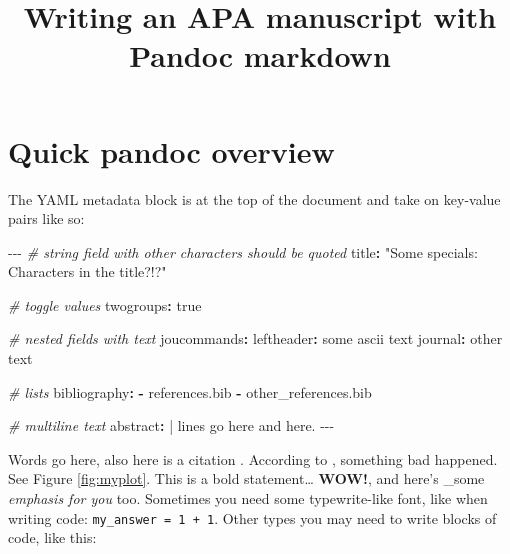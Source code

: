 \documentclass[man,longtable,noextraspace,floatsintext]{apa6}
\title{Writing an APA manuscript with Pandoc markdown}
\newenvironment{Shaded}{}{}
\newcommand{\AttributeTok}[1]{\textcolor[rgb]{0.49,0.56,0.16}{#1}}
\newcommand{\CharTok}[1]{\textcolor[rgb]{0.25,0.44,0.63}{#1}}
\newcommand{\CommentTok}[1]{\textcolor[rgb]{0.38,0.63,0.69}{\textit{#1}}}
\newcommand{\FunctionTok}[1]{\textcolor[rgb]{0.02,0.16,0.49}{#1}}
\newcommand{\KeywordTok}[1]{\textcolor[rgb]{0.00,0.44,0.13}{\textbf{#1}}}
\newcommand{\NormalTok}[1]{#1}
\newcommand{\PreprocessorTok}[1]{\textcolor[rgb]{0.74,0.48,0.00}{#1}}
\newcommand{\StringTok}[1]{\textcolor[rgb]{0.25,0.44,0.63}{#1}}
\begin{document}
\maketitle

\hypertarget{quick-pandoc-overview}{%
\section{Quick pandoc overview}\label{quick-pandoc-overview}}

The YAML metadata block is at the top of the document and take on
key-value pairs like so:

\begin{Shaded}
\begin{Highlighting}[]
\PreprocessorTok{{-}{-}{-}}
\CommentTok{\# string field with other characters should be quoted}
\FunctionTok{title}\KeywordTok{:}\AttributeTok{ }\StringTok{"Some specials: Characters in the title?!?"}

\CommentTok{\# toggle values}
\FunctionTok{twogroups}\KeywordTok{:}\AttributeTok{ }\CharTok{true}

\CommentTok{\# nested fields with text}
\FunctionTok{joucommands}\KeywordTok{:}
\AttributeTok{    }\FunctionTok{leftheader}\KeywordTok{:}\AttributeTok{ some ascii text}
\AttributeTok{    }\FunctionTok{journal}\KeywordTok{:}\AttributeTok{ other text}

\CommentTok{\# lists}
\FunctionTok{bibliography}\KeywordTok{:}
\AttributeTok{    }\KeywordTok{{-}}\AttributeTok{ references.bib}
\AttributeTok{    }\KeywordTok{{-}}\AttributeTok{ other\_references.bib}

\CommentTok{\# multiline text}
\FunctionTok{abstract}\KeywordTok{: }\CharTok{|}
\NormalTok{    lines go here}
\NormalTok{    and here.}
\PreprocessorTok{{-}{-}{-}}
\end{Highlighting}
\end{Shaded}

Words go here, also here is a citation \autocite{someArticle}. According
to \textcite{anotherArticle}, something bad happened. See Figure
\ref{fig:myplot}. This is a bold statement\ldots{} \textbf{WOW!}, and
here's \_some \emph{emphasis for you} too. Sometimes you need some
typewrite-like font, like when writing code:
\texttt{my\_answer\ =\ 1\ +\ 1}. Other types you may need to write
blocks of code, like this:
\end{document}
